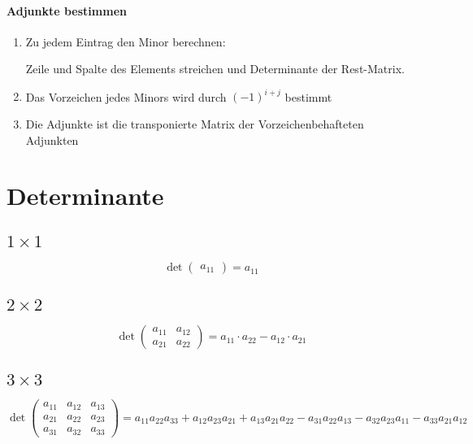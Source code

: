 \paragraph{Adjunkte bestimmen}
\begin{enumerate}
    \item
        Zu jedem Eintrag den Minor berechnen:

        Zeile und Spalte des Elements streichen und Determinante der Rest-Matrix.

    \item
        Das Vorzeichen jedes Minors wird durch ${(-1)}^{i+j}$ bestimmt

    \item
        Die Adjunkte ist die transponierte Matrix der Vorzeichenbehafteten Adjunkten
\end{enumerate}

\section{Determinante}
\subsection{$1 \times 1$}
\begin{equation}
    \det \begin{pmatrix} a_{11} \end{pmatrix} = a_{11}
\end{equation}

\subsection{$2 \times 2$}
\begin{equation}
    \det
        \begin{pmatrix}
            a_{11} & a_{12} \\
            a_{21} & a_{22}
        \end{pmatrix}
    = a_{11} \cdot a_{22} - a_{12} \cdot a_{21}
\end{equation}

\subsection{$3 \times 3$}
\begin{equation}
    \det
        \begin{pmatrix}
            a_{11} & a_{12} & a_{13}\\
            a_{21} & a_{22} & a_{23} \\
            a_{31} & a_{32} & a_{33}
        \end{pmatrix}
    = a_{11} a_{22} a_{33} + a_{12} a_{23} a_{21} + a_{13} a_{21} a_{22} -
    a_{31} a_{22} a_{13} - a_{32} a_{23} a_{11} - a_{33} a_{21} a_{12}
\end{equation}

